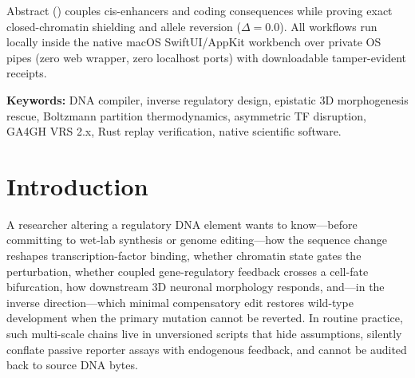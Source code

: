 \documentclass[10.5pt,a4paper]{article}
\begin{document}
\begin{abstractbox}{Abstract}
() couples cis-enhancers and coding consequences while proving exact closed-chromatin shielding and allele reversion ($\Delta=0.0$). All workflows run locally inside the native macOS SwiftUI/AppKit workbench over private OS pipes (zero web wrapper, zero localhost ports) with downloadable tamper-evident receipts.

\smallskip\noindent\textbf{Keywords:} DNA compiler, inverse regulatory design, epistatic 3D morphogenesis rescue, Boltzmann partition thermodynamics, asymmetric TF disruption, GA4GH VRS 2.x, Rust replay verification, native scientific software.
\end{abstractbox}

\section{Introduction}

A researcher altering a regulatory DNA element wants to know—before committing to wet-lab synthesis or genome editing—how the sequence change reshapes transcription-factor binding, whether chromatin state gates the perturbation, whether coupled gene-regulatory feedback crosses a cell-fate bifurcation, how downstream 3D neuronal morphology responds, and—in the inverse direction—which minimal compensatory edit restores wild-type development when the primary mutation cannot be reverted. In routine practice, such multi-scale chains live in unversioned scripts that hide assumptions, silently conflate passive reporter assays with endogenous feedback, and cannot be audited back to source DNA bytes.
\end{document}
